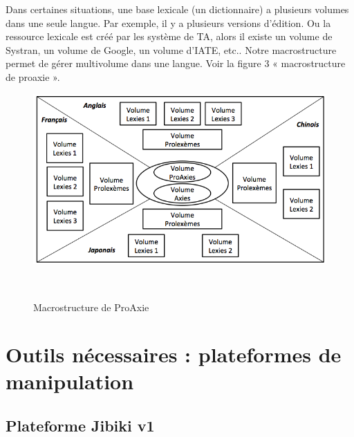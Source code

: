 \documentclass[10pt,a4paper,twoside]{article}
\begin{document}
Dans certaines situations, une base lexicale (un dictionnaire) a plusieurs volumes dans une seule langue. Par exemple, il y a plusieurs versions d’édition. Ou la ressource lexicale est créé par les système de TA, alors il existe un volume de Systran, un volume de Google, un volume d’IATE, etc.. Notre macrostructure permet de gérer multivolume dans une langue. Voir la figure 3 « macrostructure de proaxie ».\\
\begin{figure}[htbp] 
\begin{center} 
\includegraphics[width=12cm]{images/proaxie.png}
\end{center} 
\caption{Macrostructure de ProAxie} \label{image} \
\end{figure}

\section{Outils nécessaires : plateformes de manipulation}

\subsection{Plateforme Jibiki v1}
\end{document}
